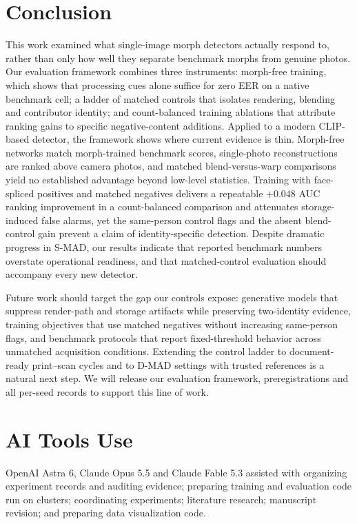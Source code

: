 \documentclass[10pt,twocolumn,letterpaper]{article}
\begin{document}
\section{Conclusion}
This work examined what single-image morph detectors actually respond to, rather than only how well they separate benchmark morphs from genuine photos. Our evaluation framework combines three instruments: morph-free training, which shows that processing cues alone suffice for zero EER on a native benchmark cell; a ladder of matched controls that isolates rendering, blending and contributor identity; and count-balanced training ablations that attribute ranking gains to specific negative-content additions. Applied to a modern CLIP-based detector, the framework shows where current evidence is thin. Morph-free networks match morph-trained benchmark scores, single-photo reconstructions are ranked above camera photos, and matched blend-versus-warp comparisons yield no established advantage beyond low-level statistics. Training with face-spliced positives and matched negatives delivers a repeatable $+0.048$ AUC ranking improvement in a count-balanced comparison and attenuates storage-induced false alarms, yet the same-person control flags and the absent blend-control gain prevent a claim of identity-specific detection. Despite dramatic progress in S-MAD, our results indicate that reported benchmark numbers overstate operational readiness, and that matched-control evaluation should accompany every new detector.

Future work should target the gap our controls expose: generative models that suppress render-path and storage artifacts while preserving two-identity evidence, training objectives that use matched negatives without increasing same-person flags, and benchmark protocols that report fixed-threshold behavior across unmatched acquisition conditions. Extending the control ladder to document-ready print--scan cycles and to D-MAD settings with trusted references is a natural next step. We will release our evaluation framework, preregistrations and all per-seed records to support this line of work.

\section*{AI Tools Use}
OpenAI Astra 6, Claude Opus 5.5 and Claude Fable 5.3 assisted with organizing experiment records and auditing evidence; preparing training and evaluation code run on clusters; coordinating experiments; literature research; manuscript revision; and preparing data visualization code.
\end{document}
